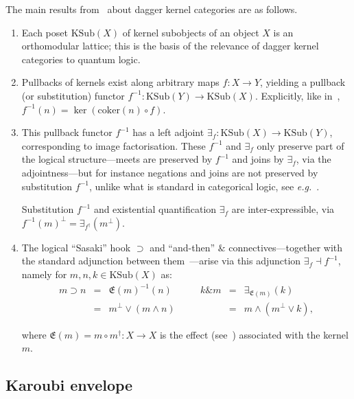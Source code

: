 \documentclass{article}
\newcommand{\after}{\mathrel{\circ}}
\newcommand{\coker}{\ensuremath{\mathrm{coker}}}
\newcommand{\KSub}{\ensuremath{\mathrm{KSub}}}
\newcommand{\sasaki}{\mathrel{\supset}}
\newcommand{\andthen}{\mathrel{\&}}
\newcommand{\conjun}{\mathrel{\wedge}}
\newcommand{\disjun}{\mathrel{\vee}}
\newcommand{\effect}[1]{\mathfrak{E}(#1)}
\begin{document}
The main results from~\cite{HeunenJ09a} about dagger kernel categories
are as follows.
\begin{enumerate}
\item Each poset $\KSub(X)$ of kernel subobjects of an object $X$ is
  an orthomodular lattice; this is the basis of the relevance of
  dagger kernel categories to quantum logic.

\item Pullbacks of kernels exist along arbitrary maps $f\colon
  X\rightarrow Y$, yielding a pullback (or substitution) functor
  $f^{-1} \colon \KSub(Y) \rightarrow \KSub(X)$. Explicitly, like
  in~\cite{Freyd64}, $f^{-1}(n) = \ker(\coker(n) \after f)$.

\item This pullback functor $f^{-1}$ has a left adjoint $\exists_{f}
  \colon \KSub(X)\rightarrow \KSub(Y)$, corresponding to image
  factorisation. These $f^{-1}$ and $\exists_f$ only preserve part of
  the logical structure---meets are preserved by $f^{-1}$ and joins by
  $\exists_f$, via the adjointness---but for instance negations and
  joins are not preserved by substitution $f^{-1}$, unlike what is
  standard in categorical logic, see \textit{e.g.}~\cite{Jacobs99a}.

  Substitution $f^{-1}$ and existential quantification $\exists_{f}$
  are inter-expressible, via $f^{-1}(m)^{\perp} =
  \exists_{f^\dag}(m^{\perp})$.

\item The logical ``Sasaki'' hook $\sasaki$ and ``and-then''
  $\andthen$ connectives---together with the standard adjunction
  between them~\cite{Finch70,CoeckeS04}---arise via this adjunction
  $\exists_{f} \dashv f^{-1}$, namely for $m,n,k\in \KSub(X)$ as:
$$\begin{array}{rclcrcl}
m \sasaki n 
& = &
\effect{m}^{-1}(n)
& \quad &
k \andthen m
& = &
\exists_{\effect{m}}(k) \\
& = &
m^{\perp} \disjun (m\conjun n)
& &
& = &
m \conjun (m^{\perp} \disjun k),
\end{array}$$

\noindent where $\effect{m} = m \after m^{\dag}\colon X\rightarrow X$
is the effect (see~\cite{DvurecenskijP00}) associated with the kernel
$m$.
\end{enumerate}




\subsection{Karoubi envelope}\label{KaroubiSubsec}
\end{document}
